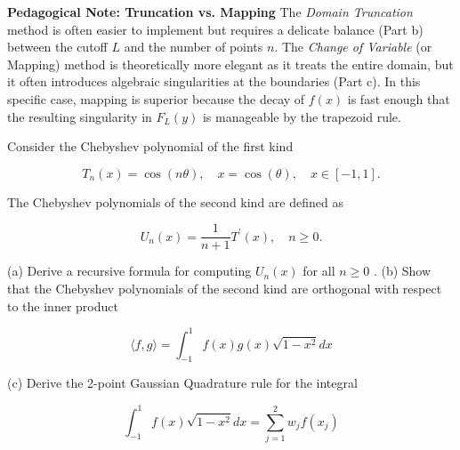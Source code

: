 \textbf{Pedagogical Note: Truncation vs. Mapping} 
The \textit{Domain Truncation} method is often easier to implement but requires a delicate balance (Part b) between the cutoff $L$ and the number of points $n$. The \textit{Change of Variable} (or Mapping) method is theoretically more elegant as it treats the entire domain, but it often introduces algebraic singularities at the boundaries (Part c). In this specific case, mapping is superior because the decay of $f(x)$ is fast enough that the resulting singularity in $F_L(y)$ is manageable by the trapezoid rule.


\begin{exercise}
\label{applied:2024:3}
Consider the Chebyshev polynomial of the first kind

\[
T _ {n} (x) = \cos (n \theta), \quad x = \cos (\theta), \quad x \in [ - 1, 1 ].
\]

The Chebyshev polynomials of the second kind are defined as

\[
U _ {n} (x) = \frac {1}{n + 1} T ^ {\prime} (x), \quad n \geq 0.
\]

(a) Derive a recursive formula for computing $U _ { n } ( x )$ for all $n \geq 0$ .   
(b) Show that the Chebyshev polynomials of the second kind are orthogonal with respect to the inner product

\[
\langle f, g \rangle = \int_ {- 1} ^ {1} f (x) g (x) \sqrt {1 - x ^ {2}} d x
\]

(c) Derive the 2-point Gaussian Quadrature rule for the integral

\[
\int_ {- 1} ^ {1} f (x) \sqrt {1 - x ^ {2}} d x = \sum_ {j = 1} ^ {2} w _ {j} f (x _ {j})
\]
\end{exercise}

